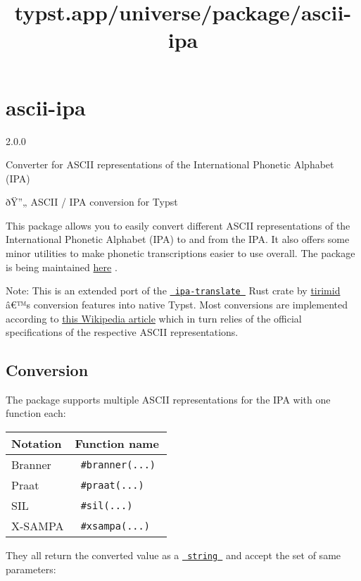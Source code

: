 \title{typst.app/universe/package/ascii-ipa}

\label{banner}
\section{ascii-ipa}\label{ascii-ipa}

{ 2.0.0 }

Converter for ASCII representations of the International Phonetic
Alphabet (IPA)

\label{readme}
ðŸ''„ ASCII / IPA conversion for Typst

This package allows you to easily convert different ASCII
representations of the International Phonetic Alphabet (IPA) to and from
the IPA. It also offers some minor utilities to make phonetic
transcriptions easier to use overall. The package is being maintained
\href{https://github.com/imatpot/typst-ascii-ipa}{here} .

Note: This is an extended port of the
\href{https://github.com/tirimid/ipa-translate}{\texttt{\ ipa-translate\ }}
Rust crate by \href{https://github.com/tirimid}{tirimid} â€™s conversion
features into native Typst. Most conversions are implemented according
to
\href{https://en.wikipedia.org/wiki/Comparison_of_ASCII_encodings_of_the_International_Phonetic_Alphabet}{this
Wikipedia article} which in turn relies of the official specifications
of the respective ASCII representations.

\subsection{Conversion}\label{conversion}

The package supports multiple ASCII representations for the IPA with one
function each:

\begin{longtable}[]{@{}ll@{}}
\toprule\noalign{}
Notation & Function name \\
\midrule\noalign{}
\endhead
\bottomrule\noalign{}
\endlastfoot
Branner & \texttt{\ \#branner(...)\ } \\
Praat & \texttt{\ \#praat(...)\ } \\
SIL & \texttt{\ \#sil(...)\ } \\
X-SAMPA & \texttt{\ \#xsampa(...)\ } \\
\end{longtable}

They all return the converted value as a
\href{https://typst.app/docs/reference/foundations/str/}{\texttt{\ string\ }}
and accept the set of same parameters:

